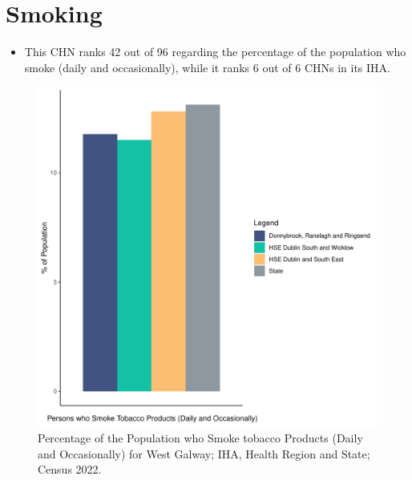 \documentclass{article}
\begin{document}
\pagebreak

\section{Smoking}\label{sect:Smoking}
\begin{itemize}
\item This CHN ranks  42 out of 96 regarding the percentage of the population who smoke (daily and occasionally), while it ranks   6 out of 6 CHNs in its IHA.
\end{itemize}
\begin{figure}[H]
	\centering
	\includegraphics[width = 120mm]{../figures/SmokingED.pdf}
	\caption{Percentage of the Population who Smoke tobacco Products (Daily and Occasionally) for West Galway; IHA, Health Region and State; Census 2022.}
	\label{fig:2ae19629-1a6a-13a3-e055-000000000001}
	\end{figure}
	
\end{document}
